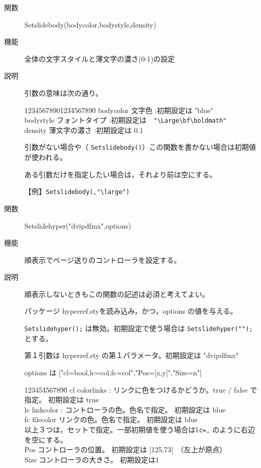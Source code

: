 \documentclass[papersize,a4paper,12pt,uplatex]{jsarticle}
\begin{document}
\begin{description}

\hypertarget{setslidebody}{}
\item[関数]Setslidebody(bodycolor,bodystyle,density)
\item[機能]全体の文字スタイルと薄文字の濃さ(0-1)の設定
\item[説明]引数の意味は次の通り。
\begin{tabbing}
1234567890123\=4567890\=\kill
bodycolor\> 文字色 :初期設定は "blue"\\
bodystyle\> フォントタイプ :初期設定は　\verb|"\Large\bf\boldmath"|\\
density\> 薄文字の濃さ :初期設定は 0.1
\end{tabbing}

引数がない場合や（ \verb|Setslidebody()|）この関数を書かない場合は初期値が使われる。

ある引数だけを指定したい場合は，それより前は空にする。

【例】\verb|Setslidebody(,"\large")|

\vspace{\baselineskip}
\hypertarget{setslidehyper}{}
\item[関数]Setslidehyper("dvipdfmx",options)
\item[機能]順表示でページ送りのコントローラを設定する。
\item[説明]順表示しないときもこの関数の記述は必須と考えてよい。

パッケージ hyperref.styを読み込み，かつ，options の値を与える。

\verb|Setslidehyper();| は無効。初期設定で使う場合は \verb|Setslidehyper("");| とする。

第１引数は hyperref.sty の第１パラメータ。初期設定は "dvipdfmx"

options は ["cl=bool,lc=col,fc=col","Pos=[x,y]","Size=n"]

\begin{tabbing}
12345\=4567890\=\kill
cl \> colorlinks : リンクに色をつけるかどうか。true / false で指定。 初期設定は true\\
lc \> linkcolor : コントローラの色。色名で指定。 初期設定は blue\\
fc\> filecolor リンクの色。色名で指定。 初期設定は blue\\
以上３つは，セットで指定。一部初期値を使う場合は\verb|lc=,| のように右辺を空にする。\\
Pos \> コントローラの位置。 初期設定は [125,73]　（左上が原点）\\
Size \> コントローラの大きさ。 初期設定は1
\end{tabbing}



\end{description}
\end{document}
